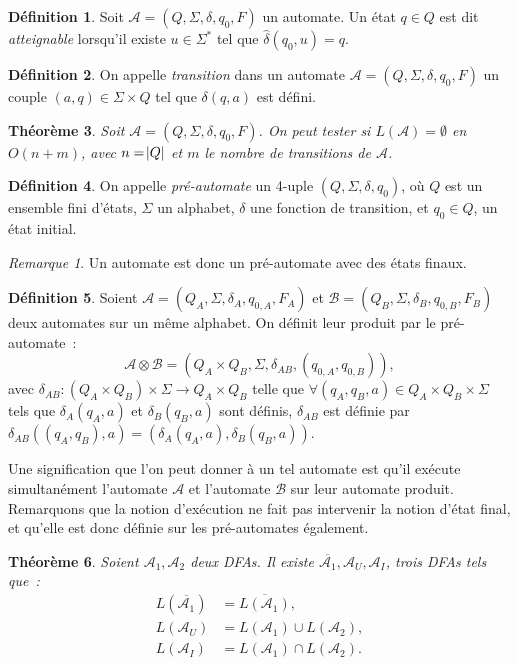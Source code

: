 \documentclass{article}
\newtheorem{thm}{Théorème}[section]
\theoremstyle{definition}
\newtheorem{déf}[thm]{Définition}
\theoremstyle{remark}
\newtheorem*{rmq}{Remarque}
\newcommand{\automaton}{(Q, \Sigma, \delta, q_0, F)}
\begin{document}
	\begin{déf} Soit $\mathcal A = \automaton$ un automate. Un état $q \in Q$ est dit \textit{atteignable} lorsqu'il existe $u \in \Sigma^*$ tel que
	$\hat \delta(q_0, u) = q$.
	\end{déf}

	\begin{déf} On appelle \textit{transition} dans un automate $\mathcal A = \automaton$ un couple $(a, q) \in \Sigma \times Q$ tel que $\delta(q, a)$	est défini.
	\end{déf}

	\begin{thm}\label{thm:langage vide} Soit $\mathcal A = \automaton$. On peut tester si $L(\mathcal A) = \emptyset$ en $O(n + m)$, avec $n = \abs Q$ et $m$
	le nombre de transitions de $\mathcal A$.
	\end{thm}

	\begin{déf} On appelle \textit{pré-automate} un 4-uple $(Q, \Sigma, \delta, q_0)$, où $Q$ est un ensemble fini d'états, $\Sigma$ un alphabet, $\delta$
	une fonction de transition, et $q_0 \in Q$, un état initial.
	\end{déf}

	\begin{rmq} Un automate est donc un pré-automate avec des états finaux.
	\end{rmq}

	\begin{déf} Soient $\mathcal A = (Q_A, \Sigma, \delta_A, q_{0,A}, F_A)$ et $\mathcal B = (Q_B, \Sigma, \delta_B, q_{0,B}, F_B)$ deux automates
	sur un même alphabet. On définit leur produit par le pré-automate~:
	\[\mathcal A \otimes \mathcal B = (Q_A \times Q_B, \Sigma, \delta_{AB}, (q_{0,A}, q_{0,B})),\]
	avec $\delta_{AB} : (Q_A \times Q_B) \times \Sigma \to Q_A \times Q_B$ telle que $\forall (q_A, q_B, a) \in Q_A \times Q_B \times \Sigma$ tels que
	$\delta_A(q_A, a)$ et $\delta_B(q_B, a)$ sont définis, $\delta_{AB}$ est définie par $\delta_{AB}((q_A, q_B), a) = (\delta_A(q_A, a), \delta_B(q_B, a))$.
	\end{déf}

	Une signification que l'on peut donner à un tel automate est qu'il exécute simultanément l'automate $\mathcal A$ et l'automate $\mathcal B$
	sur leur automate produit. Remarquons que la notion d'exécution ne fait pas intervenir la notion d'état final, et qu'elle est donc définie sur les
	pré-automates également.

	\begin{thm}\label{thm:dérivation automates} Soient $\mathcal A_1, \mathcal A_2$ deux DFAs. Il existe $\overline {\mathcal A_1}, \mathcal A_U, \mathcal A_I$,
	trois DFAs tels que~:
	\begin{align*}
		L(\overline {\mathcal A_1}) &= \overline {L(\mathcal A_1)}, \\
		L(\mathcal A_U) &= L(\mathcal A_1) \cup L(\mathcal A_2), \\
		L(\mathcal A_I) &= L(\mathcal A_1) \cap L(\mathcal A_2).
	\end{align*}
	\end{thm}
\end{document}

